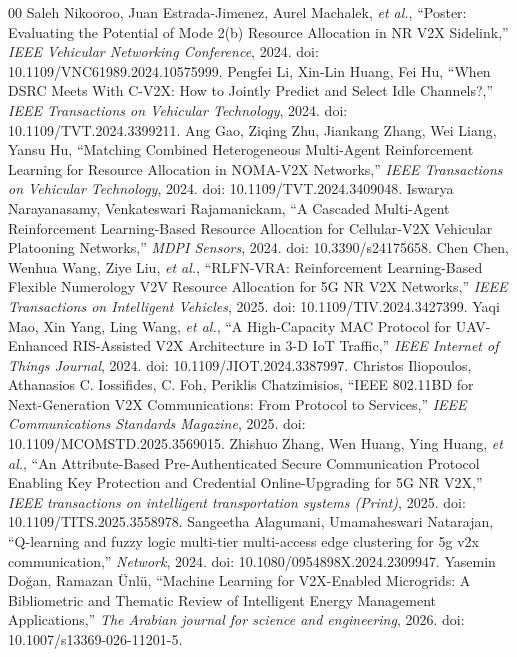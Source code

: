 \documentclass[journal]{IEEEtran}
\begin{document}
\begin{thebibliography}{00}
 Saleh Nikooroo, Juan Estrada-Jimenez, Aurel Machalek, \emph{et al.}, ``Poster: Evaluating the Potential of Mode 2(b) Resource Allocation in NR V2X Sidelink,'' \emph{IEEE Vehicular Networking Conference}, 2024. doi: 10.1109/VNC61989.2024.10575999.
 Pengfei Li, Xin-Lin Huang, Fei Hu, ``When DSRC Meets With C-V2X: How to Jointly Predict and Select Idle Channels?,'' \emph{IEEE Transactions on Vehicular Technology}, 2024. doi: 10.1109/TVT.2024.3399211.
 Ang Gao, Ziqing Zhu, Jiankang Zhang, Wei Liang, Yansu Hu, ``Matching Combined Heterogeneous Multi-Agent Reinforcement Learning for Resource Allocation in NOMA-V2X Networks,'' \emph{IEEE Transactions on Vehicular Technology}, 2024. doi: 10.1109/TVT.2024.3409048.
 Iswarya Narayanasamy, Venkateswari Rajamanickam, ``A Cascaded Multi-Agent Reinforcement Learning-Based Resource Allocation for Cellular-V2X Vehicular Platooning Networks,'' \emph{MDPI Sensors}, 2024. doi: 10.3390/s24175658.
 Chen Chen, Wenhua Wang, Ziye Liu, \emph{et al.}, ``RLFN-VRA: Reinforcement Learning-Based Flexible Numerology V2V Resource Allocation for 5G NR V2X Networks,'' \emph{IEEE Transactions on Intelligent Vehicles}, 2025. doi: 10.1109/TIV.2024.3427399.
 Yaqi Mao, Xin Yang, Ling Wang, \emph{et al.}, ``A High-Capacity MAC Protocol for UAV-Enhanced RIS-Assisted V2X Architecture in 3-D IoT Traffic,'' \emph{IEEE Internet of Things Journal}, 2024. doi: 10.1109/JIOT.2024.3387997.
 Christos Iliopoulos, Athanasios C. Iossifides, C. Foh, Periklis Chatzimisios, ``IEEE 802.11BD for Next-Generation V2X Communications: From Protocol to Services,'' \emph{IEEE Communications Standards Magazine}, 2025. doi: 10.1109/MCOMSTD.2025.3569015.
 Zhishuo Zhang, Wen Huang, Ying Huang, \emph{et al.}, ``An Attribute-Based Pre-Authenticated Secure Communication Protocol Enabling Key Protection and Credential Online-Upgrading for 5G NR V2X,'' \emph{IEEE transactions on intelligent transportation systems (Print)}, 2025. doi: 10.1109/TITS.2025.3558978.
 Sangeetha Alagumani, Umamaheswari Natarajan, ``Q-learning and fuzzy logic multi-tier multi-access edge clustering for 5g v2x communication,'' \emph{Network}, 2024. doi: 10.1080/0954898X.2024.2309947.
 Yasemin Doğan, Ramazan Ünlü, ``Machine Learning for V2X-Enabled Microgrids: A Bibliometric and Thematic Review of Intelligent Energy Management Applications,'' \emph{The Arabian journal for science and engineering}, 2026. doi: 10.1007/s13369-026-11201-5.


\end{thebibliography}
\end{document}
